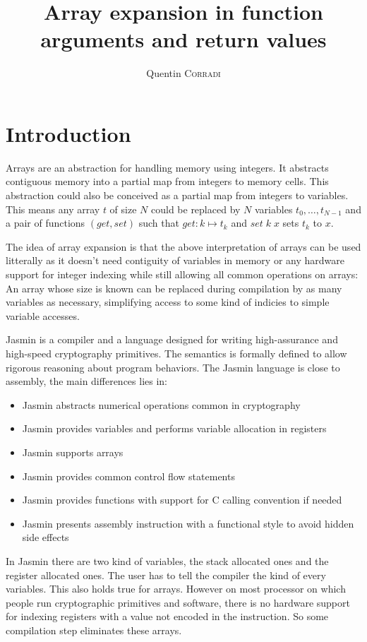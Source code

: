 \documentclass{article}
\title{Array expansion in function arguments and return values}
\author{Quentin \textsc{Corradi}}
\begin{document}
\maketitle

\section{Introduction}

Arrays are an abstraction for handling memory using integers. It abstracts
contiguous memory into a partial map from integers to memory cells. This
abstraction could also be conceived as a partial map from integers to variables.
This means any array \(t\) of size \(N\) could be replaced by \(N\) variables
\(t_0, \dots, t_{N - 1}\) and a pair of functions
\((\mathit{get}, \mathit{set})\) such that \(\mathit{get} : k \mapsto t_k\) and
\(\mathit{set}\;k\;x\) sets \(t_k\) to \(x\).

\smallskip

The idea of array expansion is that the above interpretation of arrays can be
used litterally as it doesn't need contiguity of variables in memory or any
hardware support for integer indexing while still allowing all common operations
on arrays: An array whose size is known can be replaced during compilation by as
many variables as necessary, simplifying access to some kind of indicies to
simple variable accesses.

\smallskip

Jasmin is a compiler and a language designed for writing high-assurance and
high-speed cryptography primitives. The semantics is formally defined to allow
rigorous reasoning about program behaviors.
The Jasmin language is close to assembly, the main differences lies in:
\begin{itemize}
\item Jasmin abstracts numerical operations common in cryptography
\item Jasmin provides variables and performs variable allocation in registers
\item Jasmin supports arrays
\item Jasmin provides common control flow statements
\item Jasmin provides functions with support for C calling convention if needed
\item Jasmin presents assembly instruction with a functional style to avoid
hidden side effects
\end{itemize}\smallskip

In Jasmin there are two kind of variables, the stack allocated ones and the
register allocated ones. The user has to tell the compiler the kind of every
variables. This also holds true for arrays. However on most processor on which
people run cryptographic primitives and software, there is no hardware support
for indexing registers with a value not encoded in the instruction. So some
compilation step eliminates these arrays.
\end{document}
